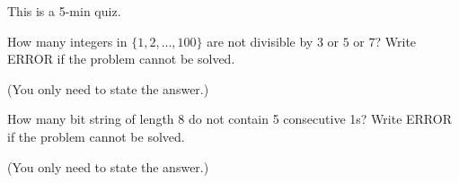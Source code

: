 

\renewcommand\AUTHOR{jdoe5@cougars.ccis.edu} %


\topmattertwo

This is a 5-min quiz.

\nextq
How many integers in $\{1,2,...,100\}$ are not divisible by $3$ or $5$ or $7$?
Write ERROR if the problem cannot be solved.
\\
\ANSWER
\begin{answerlong}
\end{answerlong}
(You only need to state the answer.)

\nextq
How many bit string of length 8 do not contain 5 consecutive 1s?
Write ERROR if the problem cannot be solved.
\\
\ANSWER
\begin{answerlong}
\end{answerlong}
(You only need to state the answer.)

\newpage


